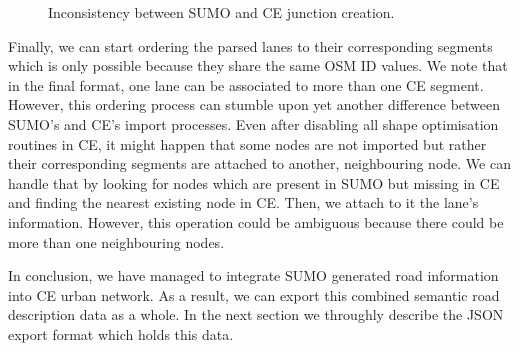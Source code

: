 \begin{figure}[htb]
	\centering
	\caption{Inconsistency between SUMO and CE junction creation.}
\end{figure}

Finally, we can start ordering the parsed lanes to their corresponding segments which is only possible because they share the same OSM ID values. We note that in the final format, one lane can be associated to more than one CE segment. However, this ordering process can stumble upon yet another difference between SUMO's and CE's import processes. Even after disabling all shape optimisation routines in CE, it might happen that some nodes are not imported but rather their corresponding segments are attached to another, neighbouring node. We can handle that by looking for nodes which are present in SUMO but missing in CE and finding the nearest existing node in CE. Then, we attach to it the lane's information. However, this operation could be ambiguous because there could be more than one neighbouring nodes. 

In conclusion, we have managed to integrate SUMO generated road information into CE urban network. As a result, we can export this combined semantic road description data as a whole. In the next section we throughly describe the JSON export format which holds this data.


